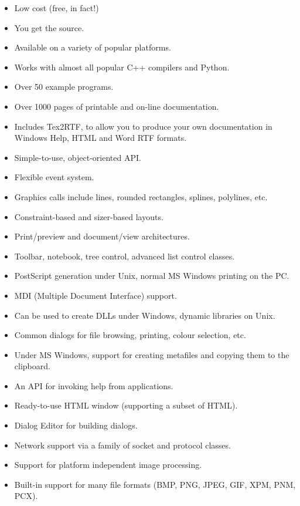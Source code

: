 \begin{itemize}\itemsep=0pt
\item Low cost (free, in fact!)
\item You get the source.
\item Available on a variety of popular platforms.
\item Works with almost all popular C++ compilers and Python.
\item Over 50 example programs.
\item Over 1000 pages of printable and on-line documentation.
\item Includes Tex2RTF, to allow you to produce your own documentation
in Windows Help, HTML and Word RTF formats.
\item Simple-to-use, object-oriented API.
\item Flexible event system.
\item Graphics calls include lines, rounded rectangles, splines, polylines, etc.
\item Constraint-based and sizer-based layouts.
\item Print/preview and document/view architectures.
\item Toolbar, notebook, tree control, advanced list control classes.
\item PostScript generation under Unix, normal MS Windows printing on the PC.
\item MDI (Multiple Document Interface) support.
\item Can be used to create DLLs under Windows, dynamic libraries on Unix.
\item Common dialogs for file browsing, printing, colour selection, etc.
\item Under MS Windows, support for creating metafiles and copying
them to the clipboard.
\item An API for invoking help from applications.
\item Ready-to-use HTML window (supporting a subset of HTML).
\item Dialog Editor for building dialogs.
\item Network support via a family of socket and protocol classes.
\item Support for platform independent image processing.
\item Built-in support for many file formats (BMP, PNG, JPEG, GIF, XPM, PNM, PCX).
\end{itemize}


